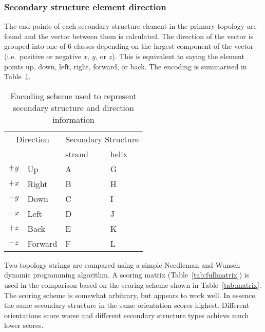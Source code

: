 \documentclass{article}
\begin{document}
\subsubsection{Secondary structure element direction}
The end-points of each secondary structure element in the primary
topology are found and the vector between them is calculated. The
direction of the vector is grouped into one of 6 classes depending on
the largest component of the vector (i.e.\ positive or negative $x$,
$y$, or $z$). This is equivalent to saying the element points up,
down, left, right, forward, or back. The encoding is summarised in
Table~\ref{tab:encoding}.

\begin{table}
\begin{center}
\begin{tabular}{llll} \hline
\multicolumn{2}{c}{Direction} & \multicolumn{2}{c}{Secondary Structure}\\ \cline{3-4}
          &         & strand & helix  \\ \hline
$+y$      & Up      & A      & G      \\
$+x$      & Right   & B      & H      \\
$-y$      & Down    & C      & I      \\
$-x$      & Left    & D      & J      \\
$+z$      & Back    & E      & K      \\
$-z$      & Forward & F      & L      \\ \hline
\end{tabular}
\end{center}
\caption{\label{tab:encoding}Encoding scheme used to represent
          secondary structure and direction information}
\end{table}


Two topology strings are compared using a simple Needleman and Wunsch
dynamic programming algorithm. A scoring matrix
(Table~\ref{tab:fullmatrix}) is used in the comparison based on the
scoring scheme shown in Table~\ref{tab:matrix}. The scoring scheme is
somewhat arbitrary, but appears to work well.  In essence, the same
secondary structure in the same orientation scores highest. Different
orientations score worse and different secondary structure types
achieve much lower scores.
\end{document}
